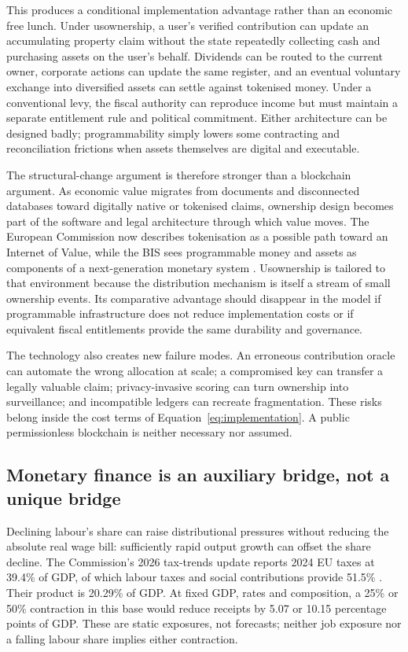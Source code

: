 This produces a conditional implementation advantage rather than an economic free lunch. Under usownership, a user's verified contribution can update an accumulating property claim without the state repeatedly collecting cash and purchasing assets on the user's behalf. Dividends can be routed to the current owner, corporate actions can update the same register, and an eventual voluntary exchange into diversified assets can settle against tokenised money. Under a conventional levy, the fiscal authority can reproduce income but must maintain a separate entitlement rule and political commitment. Either architecture can be designed badly; programmability simply lowers some contracting and reconciliation frictions when assets themselves are digital and executable.

The structural-change argument is therefore stronger than a blockchain argument. As economic value migrates from documents and disconnected databases toward digitally native or tokenised claims, ownership design becomes part of the software and legal architecture through which value moves. The European Commission now describes tokenisation as a possible path toward an Internet of Value, while the BIS sees programmable money and assets as components of a next-generation monetary system \citep{eciov2026,bis2025}. Usownership is tailored to that environment because the distribution mechanism is itself a stream of small ownership events. Its comparative advantage should disappear in the model if programmable infrastructure does not reduce implementation costs or if equivalent fiscal entitlements provide the same durability and governance.

The technology also creates new failure modes. An erroneous contribution oracle can automate the wrong allocation at scale; a compromised key can transfer a legally valuable claim; privacy-invasive scoring can turn ownership into surveillance; and incompatible ledgers can recreate fragmentation. These risks belong inside the cost terms of Equation~\eqref{eq:implementation}. A public permissionless blockchain is neither necessary nor assumed.

\subsection{Monetary finance is an auxiliary bridge, not a unique bridge}
Declining labour's share can raise distributional pressures without reducing the absolute real wage bill: sufficiently rapid output growth can offset the share decline. The Commission's 2026 tax-trends update reports 2024 EU taxes at 39.4\% of GDP, of which labour taxes and social contributions provide 51.5\% \citep{taxtrends2026}. Their product is 20.29\% of GDP. At fixed GDP, rates and composition, a 25\% or 50\% contraction in this base would reduce receipts by 5.07 or 10.15 percentage points of GDP. These are static exposures, not forecasts; neither job exposure nor a falling labour share implies either contraction.

